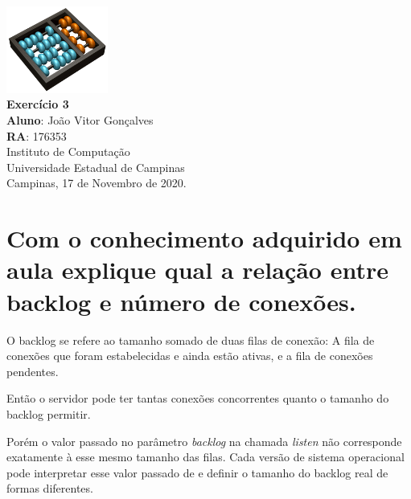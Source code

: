 \documentclass[12pt,a4paper]{report}
\begin{document}
\begin{titlepage}
        \begin{center}
                \vspace*{1cm}
                \includegraphics[width=0.25\textwidth]{Logo}\\
                \vspace{1.5cm}
                \Huge
                \textbf{Exercício 3}\\
                \vspace{1.5cm}
                \Large
                \textbf{Aluno}: João Vitor Gonçalves\\
                \textbf{RA}: 176353\\
                \vspace{1.2cm}
                \Large
                Instituto de Computação\\
                Universidade Estadual de Campinas\\
                \vspace{1.5cm}
                Campinas, 17 de Novembro de 2020.
        \end{center}
\end{titlepage}
\tableofcontents
\clearpage

\newcommand{\shellcmd}[1]{\texttt{\footnotesize\# #1}}%

\section{Com o conhecimento adquirido em aula explique qual a relação entre backlog e
número de conexões.}

O backlog se refere ao tamanho somado de duas filas de conexão: A fila de conexões que foram estabelecidas e ainda estão ativas, e a fila de conexões pendentes.

Então o servidor pode ter tantas conexões concorrentes quanto o tamanho do backlog permitir.

Porém o valor passado no parâmetro \emph{backlog} na chamada \emph{listen} não corresponde exatamente à esse mesmo tamanho 
das filas. Cada versão de sistema operacional pode interpretar esse valor passado de e definir o tamanho do backlog real de formas diferentes.
\end{document}
